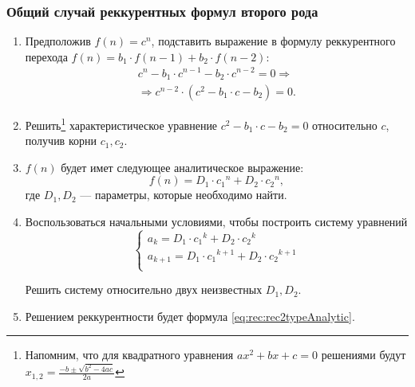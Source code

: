 \begin{frame}[allowframebreaks]
    \frametitle{Общий случай реккурентных формул второго рода}
    
    \begin{enumerate}
        \item Предположив $f(n)=c^n$, подставить выражение в формулу реккурентного перехода $f(n)=b_1\cdot f(n-1)+b_2\cdot f(n-2)$: 
        \[
            \begin{split}
                            c^n-b_1\cdot c^{n-1}-b_2\cdot c^{n-2} = 0\Rightarrow\\
                \Rightarrow c^{n-2}\cdot(c^2 - b_1\cdot c - b_2) = 0.
            \end{split}
        \]
        
        \item Решить\footnote{Напомним, что для квадратного уравнения $ax^2+bx+c=0$ решениями будут $x_{1,2}=\frac{-b\pm\sqrt{b^2-4ac}}{2a}$} характеристическое уравнение $c^2 - b_1\cdot c - b_2 = 0$ относительно $c$, получив корни $c_1,c_2$.
        
        \item $f(n)$ будет имет следующее аналитическое выражение:
        \begin{equation}
            \label{eq:rec:rec2typeAnalytic}
            f(n)=D_1\cdot {c_1}^n + D_2\cdot{c_2}^n,
        \end{equation}
        где $D_1,D_2$ --- параметры, которые необходимо найти.
        
        \item Воспользоваться начальными условиями, чтобы построить систему уравнений
        \[
            \begin{cases}
                a_k     = D_1\cdot {c_1}^k + D_2\cdot{c_2}^k\\
                a_{k+1} = D_1\cdot {c_1}^{k+1} + D_2\cdot{c_2}^{k+1}\\            
            \end{cases}
        \]
        
        Решить систему относительно двух неизвестных $D_1,D_2$.
        
        \item Решением реккурентности будет формула \eqref{eq:rec:rec2typeAnalytic}.
    \end{enumerate}
\end{frame}

